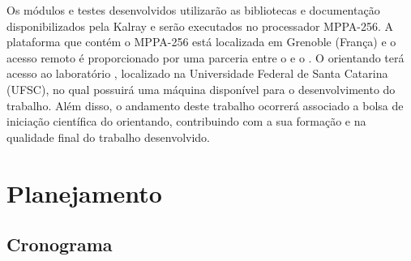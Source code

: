 \documentclass[
	12pt,				%
	openright,			%
	twoside,			%
	a4paper,			%
	english,			%
	brazil,				%
	]{abntex2}
\begin{document}
    Os módulos e testes desenvolvidos utilizarão as bibliotecas e documentação
    disponibilizados pela Kalray e serão executados no processador MPPA-256.
    A plataforma que contém o MPPA-256 está localizada em Grenoble (França) e o acesso
    remoto é proporcionado por uma parceria entre o \lapesd e o \lig.
    O orientando terá acesso ao laboratório \lapesd, localizado na Universidade
    Federal de Santa Catarina (UFSC), no qual possuirá uma máquina disponível
    para o desenvolvimento do trabalho.
    Além disso, o andamento deste trabalho ocorrerá associado a bolsa
    de iniciação científica do orientando, contribuindo com a sua formação e
    na qualidade final do trabalho desenvolvido.






\chapter{Planejamento}

\section{Cronograma}

\newcommand{\cc}{\cellcolor{black!25}}  %
\end{document}
